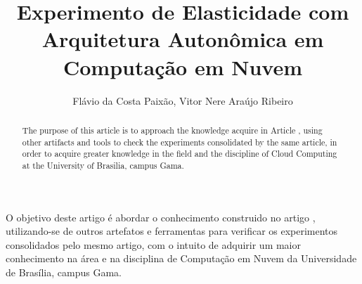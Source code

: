 \documentclass[12pt]{article}
\title{Experimento de Elasticidade com Arquitetura Autonômica em Computação em Nuvem}
\author{Flávio da Costa Paixão\inst{1}, Vitor Nere Araújo Ribeiro\inst{1}}
\begin{document}
\maketitle

\begin{abstract}
  The purpose of this article is to approach the knowledge acquire in Article \cite{coutinho_et_al:14}, using other artifacts and tools to check the experiments consolidated by the same article, in order to acquire greater knowledge in the field and the discipline of Cloud Computing at the University of Brasilia, campus Gama.
\end{abstract}

\begin{resumo}
  O objetivo deste artigo é abordar o conhecimento construido no artigo \cite{coutinho_et_al:14}, utilizando-se de outros artefatos e ferramentas para verificar os experimentos consolidados pelo mesmo artigo, com o intuito de adquirir um maior conhecimento na área e na disciplina de Computação em Nuvem da Universidade de Brasília, campus Gama.
\end{resumo}







\end{document}
